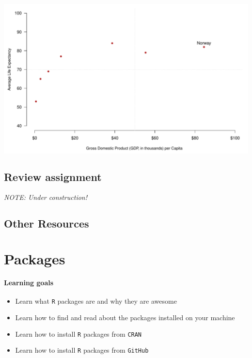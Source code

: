 \documentclass[
]{book}
\providecommand{\tightlist}{%
  \setlength{\itemsep}{0pt}\setlength{\parskip}{0pt}}
\begin{document}
\includegraphics{figures/unnamed-chunk-125-1.pdf}

\hypertarget{review-assignment-5}{%
\section*{Review assignment}\label{review-assignment-5}}

\emph{NOTE: Under construction!}

\hypertarget{other-resources-3}{%
\section*{Other Resources}\label{other-resources-3}}

\hypertarget{packages}{%
\chapter{Packages}\label{packages}}

\hypertarget{learning-goals-6}{%
\subsubsection*{Learning goals}\label{learning-goals-6}}

\begin{itemize}
\tightlist
\item
  Learn what \texttt{R} packages are and why they are awesome
\item
  Learn how to find and read about the packages installed on your machine
\item
  Learn how to install \texttt{R} packages from \texttt{CRAN}
\item
  Learn how to install \texttt{R} packages from \texttt{GitHub}
\end{itemize}
\end{document}
